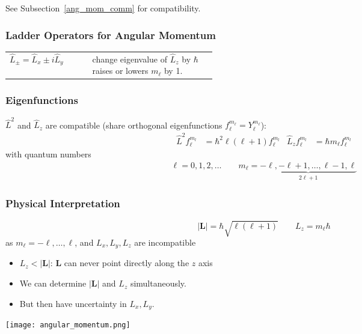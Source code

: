 See Subsection~\ref{ang_mom_comm} for compatibility.

\subsubsection{Ladder Operators for Angular Momentum}
\renewcommand{\arraystretch}{0.7}
\setlength{\oldtabcolsep}{\tabcolsep}\setlength\tabcolsep{0pt}

\begin{tabularx}{\linewidth}{@{}>{\centering\arraybackslash}p{0.4\linewidth}X@{}}
    $\widehat{L}_{\pm}=\widehat{L}_x\pm i \widehat{L}_y$
     &
    change eigenvalue of $\widehat{L}_z$ by $\hbar$ \newline raises or lowers $m_\ell$ by 1.
\end{tabularx}

\renewcommand{\arraystretch}{1}
\setlength\tabcolsep{\oldtabcolsep}


\subsubsection{Eigenfunctions}

$\widehat{L}^2$ and $\widehat{L}_z$ are compatible (share orthogonal eigenfunctions $f_{\ell}^{m_\ell}=Y_{\ell}^{m_\ell}$):
\begin{align*}
    \widehat{L}^2 f_{\ell}^{m_l} & =\hbar^{2}\ell (\ell+1) f_{\ell}^{m_l} &
    \widehat{L}_z f_{\ell}^{m_l} & =\hbar m_\ell f_{\ell}^{m_l}
\end{align*}
with quantum numbers
\begin{align*}
    \ell  =0, 1, 2,\ldots\qquad  m_\ell = \underbrace{-\ell, -\ell+1, \ldots, \ell-1, \ell}_{2\ell+1}
\end{align*}

\subsubsection{Physical Interpretation}
\noindent\begin{equation*}
    |\mathbf{L}|  =\hbar\sqrt{\ell(\ell+1)} \qquad
    L_{z}=m_{\ell}\hbar
\end{equation*}
as $m_{\ell}=-\ell,\dots,\ell$, and $L_x, L_y, L_z$ are incompatible
\begin{itemize}
    \item $L_z < |\mathbf{L}|$: $\mathbf{L}$ can never point directly along the $z$ axis
    \item We can determine $|\mathbf{L}|$ and $L_{z}$ simultaneously.
    \item But then have uncertainty in $L_x, L_y$.
\end{itemize}
\begin{center}
    \texttt{[image: angular\_momentum.png]}
\end{center}

